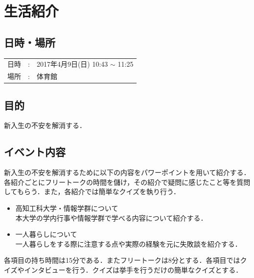 \documentclass[a4j,titlepage]{jarticle}
\begin{document}
\section{生活紹介}

\subsection{日時・場所}

\begin{tabular}{p{}rp{}}
  日時 & : & 2017年4月9日(日) 10:43 $\sim$ 11:25 \\ %
  場所 & : & 体育館
\end{tabular}

\subsection{目的}
新入生の不安を解消する．

\subsection{イベント内容}
新入生の不安を解消するために以下の内容をパワーポイントを用いて紹介する．各紹介ごとにフリートークの時間を儲け，その紹介で疑問に感じたこと等を質問してもらう．また，各紹介では簡単なクイズを執り行う．

\begin{itemize}
\item 高知工科大学・情報学群について \\
  本大学の学内行事や情報学群で学べる内容について紹介する．
\item 一人暮らしについて \\
  一人暮らしをする際に注意する点や実際の経験を元に失敗談を紹介する．
\end{itemize}

各項目の持ち時間は15分である．またフリートークは8分とする．各項目ではクイズやインタビューを行う．クイズは挙手を行うだけの簡単なクイズとする．
\end{document}
